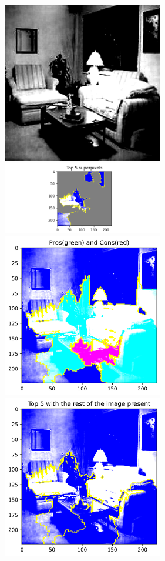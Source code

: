 \begin{figure}[H]
    \includegraphics[width=7cm]{bedroom-should-living-room.png}
    \includegraphics[width=7cm]{lime-bedroom-should-living-room.png}
    \includegraphics[width=7cm]{procon-bedroom-should-living-room.png}
    \includegraphics[width=7cm]{top5-bedroom-should-living-room.png}

\end{figure}
